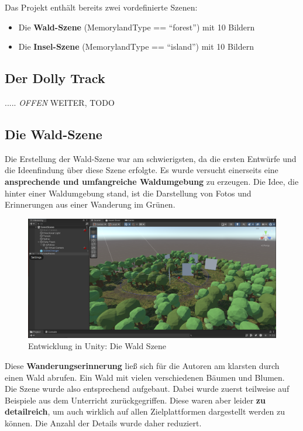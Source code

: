 Das Projekt enthält bereits zwei vordefinierte Szenen:

\begin{itemize}
    \item Die \textbf{Wald-Szene} (MemorylandType == ``forest'') mit 10 Bildern
    \item Die \textbf{Insel-Szene} (MemorylandType == ``island'') mit 10 Bildern
\end{itemize}


\subsection{Der Dolly Track}
\label{subsec:unity-dolly-track}

..... \emph{OFFEN} WEITER, TODO





\subsection{Die Wald-Szene}

Die Erstellung der Wald-Szene war am schwierigsten, da die ersten Entwürfe und die Ideenfindung über diese Szene erfolgte. Es wurde versucht einerseits eine \textbf{ansprechende und umfangreiche Waldumgebung} zu erzeugen. Die Idee, die hinter einer Waldumgebung stand, ist die Darstellung von Fotos und Erinnerungen aus einer Wanderung im Grünen.



\begin{figure} [h t]
    \centering
    \includegraphics[scale=0.15]{pics/unity-edit-forest.png}
    \caption{Entwicklung in Unity: Die Wald Szene}
    \label{fig:unity-edit-forest}
\end{figure}


Diese \textbf{Wanderungserinnerung} ließ sich für die Autoren am klarsten durch einen Wald abrufen. Ein Wald mit vielen verschiedenen Bäumen und Blumen. Die Szene wurde also entsprechend aufgebaut. Dabei wurde zuerst teilweise auf Beispiele aus dem Unterricht zurückgegriffen. Diese waren aber leider \textbf{zu detailreich}, um auch wirklich auf allen Zielplattformen dargestellt werden zu können. Die Anzahl der Details wurde daher reduziert.

